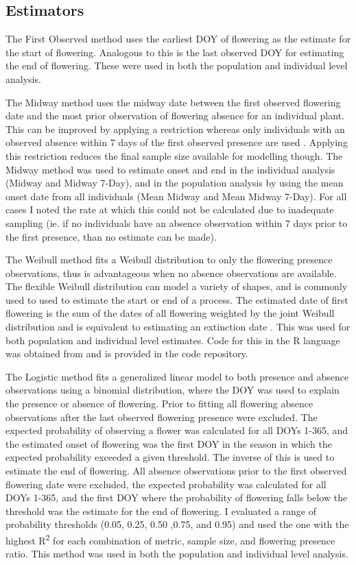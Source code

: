 \subsection{Estimators}

The First Observed method uses the earliest DOY of flowering as the estimate for the start of flowering. Analogous to this is the last observed DOY for estimating the end of flowering. These were used in both the population and individual level analysis.  

The Midway method uses the midway date between the first observed flowering date and the most prior observation of flowering absence for an individual plant. This can be improved by applying a restriction whereas only individuals with an observed absence within 7 days of the first observed presence are used \citep{gerst2016}. Applying this restriction reduces the final sample size available for modelling though. The Midway method was used to estimate onset and end in the individual analysis (Midway and Midway 7-Day), and in the population analysis by using the mean onset date from all individuals (Mean Midway and Mean Midway 7-Day). For all cases I noted the rate at which this could not be calculated due to inadequate sampling (ie. if no individuals have an absence observation within 7 days prior to the first presence, than no estimate can be made). 

The Weibull method fits a Weibull distribution to only the flowering presence observations, thus is advantageous when no absence observations are available. The flexible Weibull distribution can model a variety of shapes, and is commonly used to used to estimate the start or end of a process. The estimated date of first flowering is the sum of the dates of all flowering weighted by the joint Weibull distribution and is equivalent to estimating an extinction date \citep{roberts2003, pearse2017}. This was used for both population and individual level estimates. Code for this in the R language was obtained from \cite{pearse2017} and is provided in the code repository. 

The Logistic method fits a generalized linear model to both presence and absence observations using a binomial distribution, where the DOY was used to explain the presence or absence of flowering. Prior to fitting all flowering absence observations after the last observed flowering presence were excluded. The expected probability of observing a flower was calculated for all DOYs 1-365, and the estimated onset of flowering was the first DOY in the season in which the expected probability exceeded a given threshold. The inverse of this is used to estimate the end of flowering. All absence observations prior to the first observed flowering date were excluded, the expected probability was calculated for all DOYs 1-365, and the first DOY where the probability of flowering falls below the threshold was the estimate for the end of flowering. I evaluated a range of probability thresholds (0.05, 0.25, 0.50 ,0.75, and 0.95) and used the one with the highest R\textsuperscript{2} for each combination of metric, sample size, and flowering presence ratio. This method was used in both the population and individual level analysis. 

